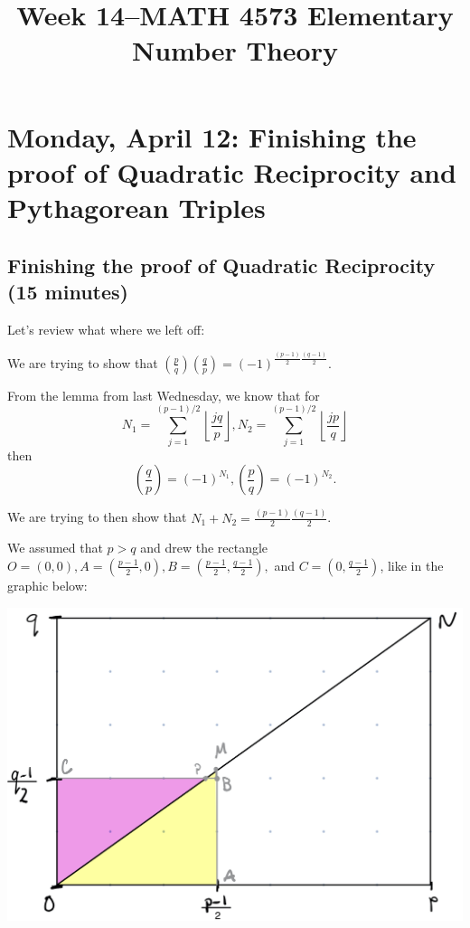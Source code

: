 \documentclass[letterpaper, 11 pt]{article}
\title{Week 14--MATH 4573 Elementary Number Theory}
\begin{document}
\maketitle
\section{Monday, April 12: Finishing the proof of Quadratic Reciprocity and Pythagorean Triples}

\subsection{Finishing the proof of Quadratic Reciprocity (15 minutes)}
Let's review what where we left off: 

We are trying to show that $\left(\frac{p}{q}\right)\left(\frac{q}{p}\right)=(-1)^{\frac{(p-1)}{2}\frac{(q-1)}{2}}$.

From the lemma from last Wednesday, we know that for \[N_1=\sum_{j=1}^{(p-1)/2}\left\lfloor\frac{jq}{p}\right\rfloor, N_2=\sum_{j=1}^{(p-1)/2}\left\lfloor\frac{jp}{q}\right\rfloor\] then \[\left(\frac{q}{p}\right)=(-1)^{N_1}, \left(\frac{p}{q}\right)=(-1)^{N_2}.\]

We are trying to then show that $N_1+N_2=\frac{(p-1)}{2}\frac{(q-1)}{2}$.

We assumed that $p>q$ and drew the rectangle 
$O=(0,0), A=\left(\frac{p-1}{2},0\right), B=\left(\frac{p-1}{2},\frac{q-1}{2}\right),$ and $C=\left(0,\frac{q-1}{2}\right)$, like in the graphic below:

\includegraphics[width=\textwidth]{lattice}
\end{document}
